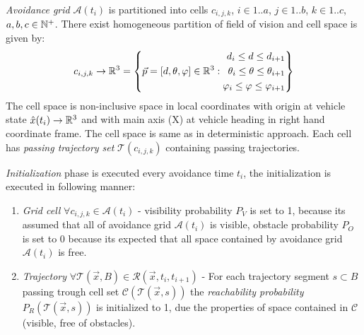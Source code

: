 \emph{Avoidance grid} $\mathscr{A}(t_i)$ is partitioned into cells $c_{i,j,k}$, $i\in{1..a}$, $j\in{1..b}$, $k\in{1..c}$, $a,b,c\in\mathbb{N}^+$. There exist homogeneous partition of field of vision and cell space is given by:
\begin{equation}
    c_{i,j,k}\to\mathbb{R}^3=\left\{\vec{p}=[d,\theta,\varphi]\in\mathbb{R}^3:\begin{aligned}d_i \le d\le d_{i+1}\\\theta_i\le\theta\le\theta_{i+1}\\\varphi_i\le\varphi\le\varphi_{i+1}\end{aligned}\right\}
\end{equation}
\noindent The cell space is non-inclusive space in local coordinates with origin at vehicle state $\hat{x}(t_i)\to\mathbb{R}^3$ and with main axis (X) at vehicle heading in right hand coordinate frame. The cell space is same as in deterministic approach. Each cell has \emph{passing trajectory set} $\mathscr{T}(c_{i,j,k})$ containing passing trajectories. 

\emph{Initialization} phase is executed every avoidance time $t_i$, the initialization is executed in following manner:
\begin{enumerate}
    \item \emph{Grid cell} $\forall c_{i,j,k}\in\mathscr{A}(t_i)$ - visibility probability $P_V$ is set to 1, because its assumed that all of avoidance grid $\mathscr{A}(t_i)$ is visible, obstacle probability $P_O$ is set to 0 because its expected that all space contained by avoidance grid $\mathscr{A}(t_i)$ is free.
    \item \emph{Trajectory} $\forall \mathscr{T}(\vec{x},B)\in\mathscr{R}(\vec{x},t_i,t_{i+1})$ - For each trajectory segment $s\subset B$ passing trough cell set $\mathscr{C}(\mathscr{T}(\vec{x},s))$ the \emph{reachability probability} $P_R(\mathscr{T}(\vec{x},s))$ is initialized to 1, due the properties of space contained in $\mathscr{C}$ (visible, free of obstacles).
\end{enumerate}

